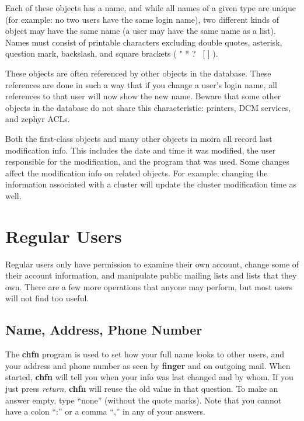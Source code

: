 Each of these objects has a name, and while all names of a given type
are unique (for example: no two users have the same login name), two different
kinds of object may have the same name (a user may have the same name
as a list).  Names must consist of printable characters excluding
double quotes, asterisk, question mark, backslash, and square brackets
( " * ? \ [ ] ).

These objects are often referenced by other objects in the database.
These references are done in such a way that if you change a user's
login name, all references to that user will now show the new name.
Beware that some other objects in the database do not share this
characteristic: printers, DCM services, and zephyr ACLs.

Both the first-class objects and many other objects in moira all record
last modification info.  This includes the date and time it was
modified, the user responsible for the modification, and the program
that was used.  Some changes affect the modification info on related
objects.  For example: changing the information associated with a
cluster will update the cluster modification time as well.

\chapter{Regular Users}

Regular users only have permission to examine their own account,
change some of their account information, and manipulate public
mailing lists and lists that they own.  There are a few more
operations that anyone may perform, but most users will not find too
useful.

\section{Name, Address, Phone Number}

The {\bf chfn} program is used to set how your full name looks to
other users, and your address and phone number as seen by {\bf finger}
and on outgoing mail.  When started, {\bf chfn} will tell you when
your info was last changed and by whom.  If you just press {\em
return}, {\bf chfn} will reuse the old value in that question.  To
make an answer empty, type ``none'' (without the quote marks).  Note
that you cannot have a colon ``:'' or a comma ``,'' in any of your
answers.

